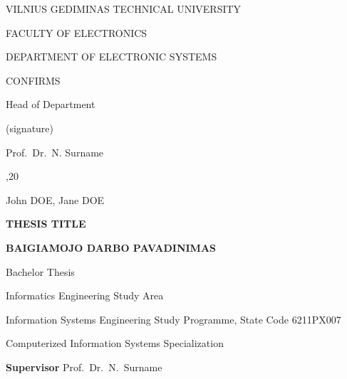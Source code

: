 \begin{center}
    \Large \MakeUppercase{Vilnius Gediminas Technical University}

    \large \MakeUppercase{Faculty of Electronics}

    \large \MakeUppercase{Department of Electronic Systems}
    \vskip 2cm
    \noindent
    \begin{minipage}[t]{0.66\textwidth}
    \end{minipage}%
    \hfill %
    \begin{minipage}[t]{0.33\textwidth}
        \large \MakeUppercase{Confirms}

        \large Head of Department

        \vskip 0.5cm

        \hrulefill{}

        \centering \small (signature) \flushleft{}

        \large Prof.\ Dr.\ N. Surname

        \vskip 0.2cm

        \makebox[3.5cm]{\hrulefill}
        ,20
        \hrulefill{}
    \end{minipage}
    \vskip 1cm

    \Large John DOE, Jane DOE

    \vskip 1cm

    \Large \MakeUppercase{\textbf{Thesis title}}

    \Large \MakeUppercase{\textbf{Baigiamojo darbo pavadinimas}}

    \vskip 1cm

    \Large Bachelor Thesis

    \vskip 2cm

    \large Informatics Engineering Study Area

    \large Information Systems Engineering Study Programme, State Code 6211PX007

    \large Computerized Information Systems Specialization

    \vskip 2cm


    \begin{minipage}[t]{0.20\textwidth}
    \end{minipage}%
    \hfill %
    \begin{minipage}[t]{0.80\textwidth}
        \large\textbf{Supervisor}
        \hspace{0.3cm}
        Prof.\ Dr.\ N.\ Surname
        \hspace{0.5cm}
        \makebox[3cm]{\hrulefill}
        \hspace{0.5cm}
        \makebox[3cm]{\hrulefill}


\end{minipage}
\end{center}
